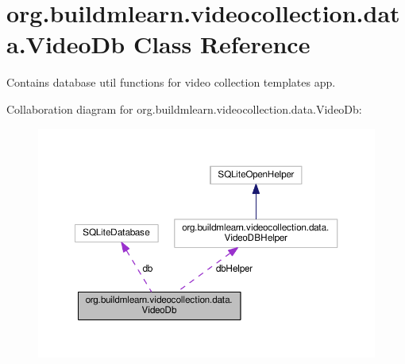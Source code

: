 \hypertarget{classorg_1_1buildmlearn_1_1videocollection_1_1data_1_1VideoDb}{}\section{org.\+buildmlearn.\+videocollection.\+data.\+Video\+Db Class Reference}
\label{classorg_1_1buildmlearn_1_1videocollection_1_1data_1_1VideoDb}


Contains database util functions for video collection template\textquotesingle{}s app.  




Collaboration diagram for org.\+buildmlearn.\+videocollection.\+data.\+Video\+Db\+:
\nopagebreak
\begin{figure}[H]
\begin{center}
\leavevmode
\includegraphics[width=350pt]{classorg_1_1buildmlearn_1_1videocollection_1_1data_1_1VideoDb__coll__graph}
\end{center}
\end{figure}
